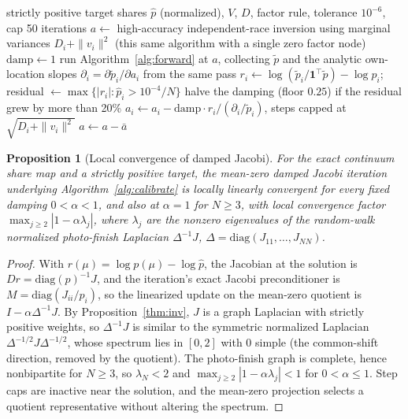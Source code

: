 \documentclass[12pt]{article}
\newtheorem{proposition}{Proposition}
\theoremstyle{remark}
\begin{document}
\begin{algorithm}[H]
\caption{Calibration (damped Jacobi quasi-Newton)}
\label{alg:calibrate}
\begin{algorithmic}[1]
\Require strictly positive target shares $\hat p$ (normalized), $V$, $D$,
factor rule, tolerance $10^{-6}$, cap 50 iterations
\State $a \gets$ high-accuracy independent-race inversion using
marginal variances $D_i + \|v_i\|^2$ (this same algorithm with a
single zero factor node) 
\State $\mathrm{damp} \gets 1$
\Repeat
  \State run Algorithm~\ref{alg:forward} at $a$, collecting $\tilde p$
  and the analytic own-location slopes $\partial_i = \partial \tilde
  p_i / \partial a_i$ from the same pass
  \State $r_i \gets \log(\tilde p_i / \mathbf{1}^\top \tilde p) -
  \log \hat p_i$; residual $\gets \max\{|r_i| : \hat p_i >
  10^{-4}/N\}$
  \State halve the damping (floor $0.25$) if the residual grew by more
  than 20\%
  \State $a_i \gets a_i - \mathrm{damp} \cdot r_i / (\partial_i /
  \tilde p_i)$, steps capped at $\sqrt{D_i + \|v_i\|^2}$
  \State $a \gets a - \bar a$ 
\end{algorithmic}
\end{algorithm}

\begin{proposition}[Local convergence of damped Jacobi]
\label{prop:jacobi}
For the exact continuum share map and a strictly positive target, the
mean-zero damped Jacobi iteration underlying
Algorithm~\ref{alg:calibrate} is locally linearly convergent for every
fixed damping $0 < \alpha < 1$, and also at $\alpha = 1$ for $N \ge 3$,
with local convergence factor $\max_{j \ge 2} |1 - \alpha \lambda_j|$,
where $\lambda_j$ are the nonzero eigenvalues of the random-walk
normalized photo-finish Laplacian $\Delta^{-1} J$,
$\Delta = \mathrm{diag}(J_{11}, \dots, J_{NN})$.
\end{proposition}

\begin{proof}
With $r(\mu) = \log p(\mu) - \log \hat p$, the Jacobian at the
solution is $Dr = \mathrm{diag}(p)^{-1} J$, and the iteration's exact
Jacobi preconditioner is $M = \mathrm{diag}(J_{ii}/p_i)$, so the
linearized update on the mean-zero quotient is $I - \alpha
\Delta^{-1} J$. By Proposition~\ref{thm:inv}, $J$ is a graph Laplacian
with strictly positive weights, so $\Delta^{-1} J$ is similar to the
symmetric normalized Laplacian $\Delta^{-1/2} J \Delta^{-1/2}$, whose
spectrum lies in $[0, 2]$ with $0$ simple (the common-shift direction,
removed by the quotient). The photo-finish graph is complete, hence
nonbipartite for $N \ge 3$, so $\lambda_N < 2$ and $\max_{j\ge2} |1 -
\alpha \lambda_j| < 1$ for $0 < \alpha \le 1$. Step caps are inactive
near the solution, and the mean-zero projection selects a quotient
representative without altering the spectrum.
\end{proof}
\end{document}

